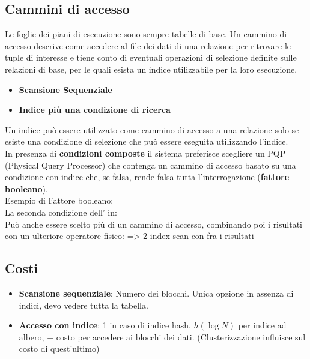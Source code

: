 \break
\subsection{Cammini di accesso}
Le foglie dei piani di esecuzione sono sempre tabelle di base. Un cammino di accesso descrive come accedere al file dei dati di una relazione per ritrovare le tuple di interesse e tiene conto di eventuali operazioni di selezione definite sulle relazioni di base, per le quali esista un indice utilizzabile per la loro esecuzione.
\begin{itemize}
    \item \textbf{Scansione Sequenziale}
    \item \textbf{Indice più una condizione di ricerca}
\end{itemize}
Un indice può essere utilizzato come cammino di accesso a una relazione solo se esiste una condizione di selezione che può essere eseguita utilizzando l’indice.\vspace{2mm} \\
In presenza di \textbf{condizioni composte} il sistema preferisce scegliere un PQP (Physical Query Processor) che contenga un cammino di accesso basato su una condizione con indice che, se falsa, rende falsa tutta l’interrogazione (\textbf{fattore booleano}).\\
Esempio di Fattore booleano:\\
\indent La seconda condizione dell' in: \vspace{2mm} \\
Può anche essere scelto più di un cammino di accesso, combinando poi i risultati con un ulteriore operatore fisico:  => 2 index scan con  fra i risultati

\subsection{Costi}
\begin{itemize}
    \item \textbf{Scansione sequenziale}: Numero dei blocchi. Unica opzione in assenza di indici, devo vedere tutta la tabella.
    \item \textbf{Accesso con indice}: 1 in caso di indice hash, $h (\log N)$ per indice ad albero, $+$ costo per accedere ai blocchi dei dati. (Clusterizzazione influisce sul costo di quest'ultimo)
\end{itemize}

